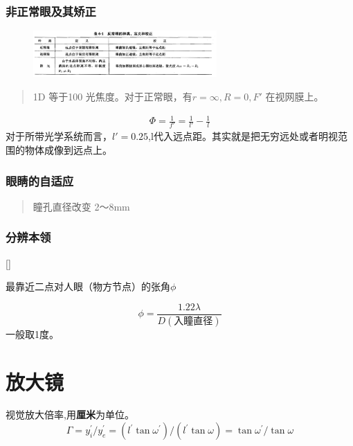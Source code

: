 \subsubsection{非正常眼及其矫正}
        \begin{figure}[H]
            \centering
            \includegraphics[width=7cm]{img/5.3.png}
            \end{figure}
\begin{quote}
{\qquad{}\ccwd\kaishu{}
1D 等于100 光焦度。对于正常眼，有$r=\infty,R=0,F'$ 在视网膜上。
}
\end{quote}
\begin{align*}
\Phi=\frac{1}{f'}=\frac{1}{l'}-\frac{1}{l}    
\end{align*}
对于所带光学系统而言，$l'=0.25$,l代入远点距。其实就是把无穷远处或者明视范围的物体成像到远点上。
\subsubsection{眼睛的自适应}
\begin{quote}
{\qquad{}\ccwd\kaishu{}
瞳孔直径改变
2～8mm

}
\end{quote}
\subsubsection{分辨本领}[]
\begin{definition}[极限分辨角]
    最靠近二点对人眼（物方节点）的张角$\phi$
\end{definition}
\begin{equation}
\phi=\frac{1.22 \lambda}{D(\text{入瞳直径})}\tag{6.1.2}
\end{equation}
一般取1度。

\section{放大镜}
视觉放大倍率,用\textbf{厘米}为单位。
\begin{equation}
    \Gamma =y_{i}^{\prime}/y_{e}^{\prime}=(l^{\prime}\tan \omega ^{\prime})/(l^{\prime}\tan \omega)= \tan \omega ^{\prime}/ \tan \omega  \tag{6.1.3}
\end{equation}

